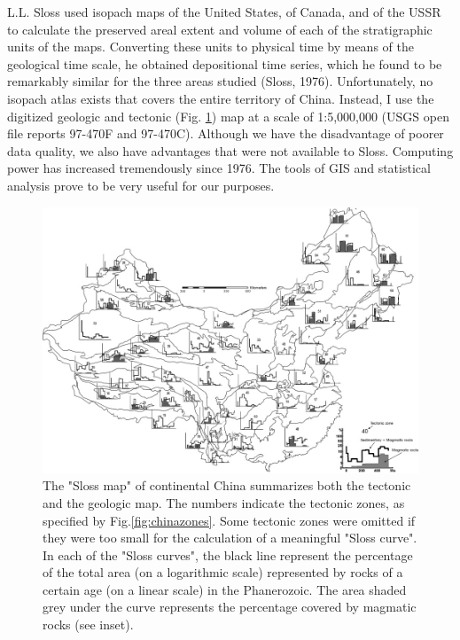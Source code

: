\documentclass{article}
\begin{document}
 L.L. Sloss used isopach maps of  the United States, of Canada, and of
 the USSR to  calculate the preserved areal extent  and volume of each
 of the  stratigraphic units of  the maps.  Converting these  units to
 physical  time by  means of  the geological  time scale,  he obtained
 depositional time series, which he found to be remarkably similar for
 the  three areas  studied (Sloss,  1976).  Unfortunately,  no isopach
 atlas exists that  covers the entire territory of  China.  Instead, I
 use     the     digitized     geologic     and     tectonic     (Fig.
 \ref{fig:chinaslossSmallMagmatic})  map  at  a scale  of  1:5,000,000
 (USGS open  file reports 97-470F  and 97-470C). Although we  have the
 disadvantage  of poorer data  quality, we  also have  advantages that
 were  not   available  to  Sloss.   Computing   power  has  increased
 tremendously since  1976.  The tools of GIS  and statistical analysis
 prove to be very useful for our purposes.  \\

 \begin{landscape}
 \begin{figure}[p] \centering
 \centerline{\includegraphics[width=1.2\textwidth]
   {chinaslossSmallMagmatic_n=1.jpg}}
 \caption{The "Sloss map" of continental China summarizes 
 both the  tectonic and  the geologic map.   The numbers  indicate the
 tectonic  zones, as  specified by  Fig.\ref{fig:chinazones}.  Some
 tectonic  zones  were  omitted  if   they  were  too  small  for  the
 calculation  of a  meaningful "Sloss  curve". In  each of  the "Sloss
 curves", the  black line represent  the percentage of the  total area
 (on a logarithmic scale) represented by  rocks of a certain age (on a
 linear  scale) in  the Phanerozoic.  The area  shaded grey  under the
 curve  represents  the  percentage  covered by  magmatic  rocks  (see
 inset).}
 \label{fig:chinaslossSmallMagmatic}
 \end{figure}
 \end{landscape}
\end{document}
